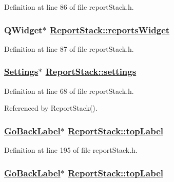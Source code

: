 Definition at line 86 of file report\-Stack.h.\hypertarget{classReportStack_r15}{
\subsubsection[reportsWidget]{\setlength{\rightskip}{0pt plus 5cm}QWidget$\ast$ \hyperlink{classReportStack_r15}{Report\-Stack::reports\-Widget}}}
\label{classReportStack_r15}


Definition at line 87 of file report\-Stack.h.\hypertarget{classReportStack_r1}{
\subsubsection[settings]{\setlength{\rightskip}{0pt plus 5cm}\hyperlink{classSettings}{Settings}$\ast$ \hyperlink{classReportStack_r1}{Report\-Stack::settings}}}
\label{classReportStack_r1}


Definition at line 68 of file report\-Stack.h.

Referenced by Report\-Stack().\hypertarget{classReportStack_r109}{
\subsubsection[topLabel]{\setlength{\rightskip}{0pt plus 5cm}\hyperlink{classGoBackLabel}{Go\-Back\-Label}$\ast$ \hyperlink{classReportStack_r11}{Report\-Stack::top\-Label}}}
\label{classReportStack_r109}


Definition at line 195 of file report\-Stack.h.\hypertarget{classReportStack_r103}{
\subsubsection[topLabel]{\setlength{\rightskip}{0pt plus 5cm}\hyperlink{classGoBackLabel}{Go\-Back\-Label}$\ast$ \hyperlink{classReportStack_r11}{Report\-Stack::top\-Label}}}
\label{classReportStack_r103}


